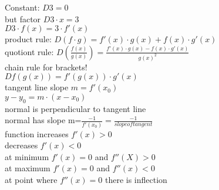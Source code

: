 \documentclass{article}
\begin{document}
  Constant: $D 3 =0$\\
  but factor $D 3\cdot x=3$\\
  $D 3\cdot f(x)=3\cdot f'(x)$\\
  product rule: $D (f\cdot g)=f'(x)\cdot g(x)+f(x)\cdot g'(x)$\\
  quotiont rule: $D (\frac{f(x)}{g(x)})=\frac{f'(x)\cdot g(x)-f(x)\cdot g'(x)}{g(x)^2}$\\
  chain rule for brackets!\\
  $D f(g(x))=f'(g(x))\cdot g'(x)$\\
  tangent line slope $m=f'(x_0)$\\
  $y-y_0=m\cdot(x-x_0)$\\
  normal is perpendicular to tangent line\\
  normal has slope m=$\frac{-1}{f'(x_0)}=\frac{-1}{slope of tangent}$\\
  function increases $f'(x)>0$\\
  decreases $f'(x)<0$\\
  at minimum $f'(x)=0$ and $f''(X)>0$\\
  at maximum $f'(x)=0$ and $f''(x)<0$\\
  at point where $f''(x)=0$ there is inflection\\


   
\end{document}
